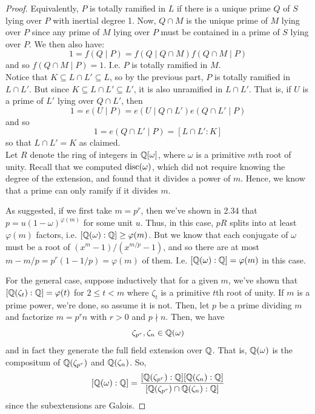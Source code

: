 \begin{proof}
	Equivalently, $P$ is totally ramified in $L$ if there is a unique prime $Q$ of $S$ lying over $P$ with inertial degree 1. Now, $Q \cap M$ is the unique prime of $M$ lying over $P$ since any prime of $M$ lying over $P$ must be contained in a prime of $S$ lying over $P$. We then also have:
	\[ 1 = f(Q \mid P) = f(Q \mid Q \cap M)f(Q \cap M \mid P) \]
	and so $f(Q \cap M \mid P) = 1$. I.e. $P$ is totally ramified in $M$. \\
	
	Notice that $K \subseteq L \cap L' \subseteq L$, so by the previous part, $P$ is totally ramified in $L \cap L'$. But since $K \subseteq L \cap L' \subseteq L'$, it is also unramified in $L \cap L'$. That is, if $U$ is a prime of $L'$ lying over $Q \cap L'$, then
	\[ 1 = e(U \mid P) = e(U \mid Q \cap L')e(Q \cap L' \mid P) \]
	and so
	\[ 1 = e(Q \cap L' \mid P) = [L \cap L' : K] \]
	so that $L \cap L' = K$ as claimed. \\
	
	Let $R$ denote the ring of integers in $\mathbb{Q}[\omega]$, where $\omega$ is a primitive $m$th root of unity. Recall that we computed $\operatorname{disc}(\omega)$, which did not require knowing the degree of the extension, and found that it divides a power of $m$. Hence, we know that a prime can only ramify if it divides $m$.
	
	As suggested, if we first take $m = p^r$, then we've shown in 2.34 that $p = u(1-\omega)^{\varphi(m)}$ for some unit $u$. Thus, in this case, $pR$ splits into at least $\varphi(m)$ factors, i.e. $[\mathbb{Q}(\omega) : \mathbb{Q}] \geq \varphi(m)$. But we know that each conjugate of $\omega$ must be a root of $(x^m-1)/(x^{m/p}-1)$, and so there are at most $m-m/p = p^r(1-1/p) = \varphi(m)$ of them. I.e. $[\mathbb{Q}(\omega):\mathbb{Q}] = \varphi(m)$ in this case.
	
	For the general case, suppose inductively that for a given $m$, we've shown that $[\mathbb{Q}(\zeta_t) : \mathbb{Q}] = \varphi(t)$ for $2 \leq t < m$ where $\zeta_t$ is a primitive $t$th root of unity. If $m$ is a prime power, we're done, so assume it is not. Then, let $p$ be a prime dividing $m$ and factorize $m = p^rn$ with $r > 0$ and $p \nmid n$. Then, we have
	\[ \zeta_{p^r},\zeta_n \in \mathbb{Q}(\omega) \]
	and in fact they generate the full field extension over $\mathbb{Q}$. That is, $\mathbb{Q}(\omega)$ is the compositum of $\mathbb{Q}(\zeta_{p^r})$ and $\mathbb{Q}(\zeta_n)$. So,
	\[ [\mathbb{Q}(\omega) : \mathbb{Q}] = \frac{[\mathbb{Q}(\zeta_{p^r}) : \mathbb{Q}][\mathbb{Q}(\zeta_n) : \mathbb{Q}]}{[\mathbb{Q}(\zeta_{p^r}) \cap \mathbb{Q}(\zeta_n) : \mathbb{Q}]} \]
	since the subextensions are Galois.
\end{proof}
